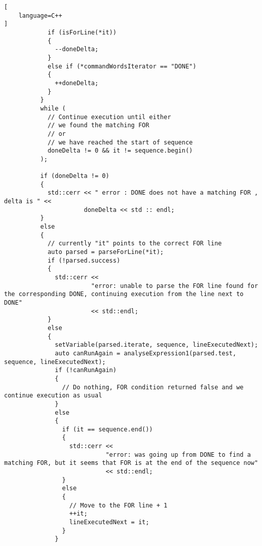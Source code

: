 \begin{lstlisting}[
	language=C++
]
            if (isForLine(*it))
            {
              --doneDelta;
            }
            else if (*commandWordsIterator == "DONE")
            {
              ++doneDelta;
            }
          }
          while (
            // Continue execution until either
            // we found the matching FOR
            // or
            // we have reached the start of sequence
            doneDelta != 0 && it != sequence.begin()
          );

          if (doneDelta != 0)
          {
            std::cerr << " error : DONE does not have a matching FOR , delta is " <<
                      doneDelta << std :: endl;
          }
          else
          {
            // currently "it" points to the correct FOR line
            auto parsed = parseForLine(*it);
            if (!parsed.success)
            {
              std::cerr <<
                        "error: unable to parse the FOR line found for the corresponding DONE, continuing execution from the line next to DONE"
                        << std::endl;
            }
            else
            {
              setVariable(parsed.iterate, sequence, lineExecutedNext);
              auto canRunAgain = analyseExpression1(parsed.test, sequence, lineExecutedNext);
              if (!canRunAgain)
              {
                // Do nothing, FOR condition returned false and we continue execution as usual
              }
              else
              {
                if (it == sequence.end())
                {
                  std::cerr <<
                            "error: was going up from DONE to find a matching FOR, but it seems that FOR is at the end of the sequence now"
                            << std::endl;
                }
                else
                {
                  // Move to the FOR line + 1
                  ++it;
                  lineExecutedNext = it;
                }
              }


\end{lstlisting}

